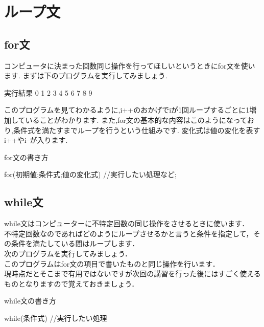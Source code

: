 ﻿\section{ループ文}
\subsection{for文}
 コンピュータに決まった回数同じ操作を行ってほしいというときにfor文を使います.
まずは下のプログラムを実行してみましょう.




\begin{itembox}{実行結果}
0 1 2 3 4 5 6 7 8 9

\end{itembox}
このプログラムを見てわかるように,i++のおかげでiが1回ループするごとに1増加していることがわかります.
また,for文の基本的な内容はこのようになっており,条件式を満たすまでループを行うという仕組みです.
変化式は値の変化を表すi++やi--が入ります.

\begin{itembox}{for文の書き方}
\begin{verbatimtab}
for(初期値;条件式;値の変化式){ 
	//実行したい処理など;
}
\end{verbatimtab}
\end{itembox}
\subsection{while文}
while文はコンピューターに不特定回数の同じ操作をさせるときに使います．\\
不特定回数なのであればどのようにループさせるかと言うと条件を指定して，その条件を満たしている間はループします．\\
次のプログラムを実行してみましょう．\\

このプログラムはfor文の項目で書いたものと同じ操作を行います．\\
現時点だとそこまで有用ではないですが次回の講習を行った後にはすごく使えるものとなりますので覚えておきましょう．\\
\begin{itembox}{while文の書き方}
\begin{verbatimtab}
while(条件式){
		//実行したい処理
}
\end{verbatimtab}
\end{itembox}

